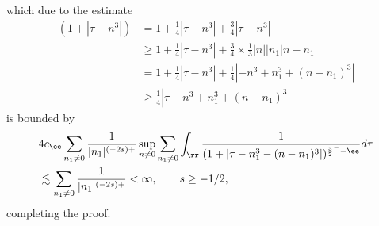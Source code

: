 %
which due to the estimate
%
%
\begin{equation}
	\label{216g}
	\begin{split}
		(1 + | \tau - n^{3} |)
		& = 1 + \frac{1}{4}| \tau - n^{3} | + \frac{3}{4}| \tau - n^{3} |
		\\
		& \ge 1 + \frac{1}{4}| \tau - n^{3} | + \frac{3}{4} \times
		\frac{1}{3}| n | |n_1 | n - n_1 |
		\\
		& = 1 + \frac{1}{4}| \tau - n^{3} | + \frac{1}{4}| -n^3 + n_1^3 + (n -
		n_1)^3 |
		\\
		& \ge \frac{1}{4}| \tau -n^3 + n_1^3 + (n - n_1)^{3} |
	\end{split}
\end{equation}
%
%
is bounded by
%
%
\begin{equation}
	\label{215g}
	\begin{split}
		& 4 c_{\ee} \sum_{n_1 \neq 0} \frac{1}{|n_1|^{(-2s)+}} \sup_{n \neq 0} \sum_{n_1 \neq 0}\int_{\rr} \frac{1}{(1 +
		| \tau - n_{1}^{3} - (n - n_{1})^{3} |)^{\frac{3}{2}^- - \ee}} d \tau
		\\
		& \lesssim \sum_{n_1 \neq 0} \frac{1}{|n_{1}|^{(-2s)+}} < \infty, \qquad s \ge
		-1/2,
	\end{split}
\end{equation}
%
%
completing the proof. \qquad \qedsymbol
%
%
